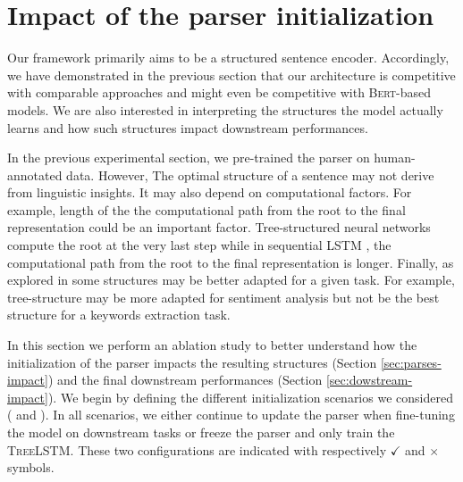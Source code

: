 


\section{Impact of the parser initialization}

Our framework primarily aims to be a structured sentence encoder. Accordingly, we have demonstrated in the previous section that our architecture is competitive with comparable approaches and might even be competitive with \textsc{Bert}-based models. We are also interested in interpreting the structures the model actually learns and how such structures impact downstream performances.

In the previous experimental section, we pre-trained the parser on human-annotated data. %
However, The optimal structure of a sentence may not derive from linguistic insights. It may also depend on computational factors. For example, length of the the computational path from the root to the final representation could be an important factor. Tree-structured neural networks compute the root at the very last step while in sequential \textsc{LSTM }, the computational path from the root to the final representation is longer. Finally, as explored in  some structures may be better adapted for a given task. For example, tree-structure may be more adapted for sentiment analysis but not be the best structure for a keywords extraction task.

In this section we perform an ablation study to better understand how the initialization of the parser impacts the resulting structures (Section \ref{sec:parses-impact}) and the final downstream performances (Section \ref{sec:dowstream-impact}). We begin by defining the different initialization scenarios we considered (
and ). In all scenarios, we either continue to update the parser when fine-tuning the model on downstream tasks or freeze the parser and only train the \textsc{TreeLSTM}. These two configurations are indicated with respectively \textbf{$\checkmark$} and \textbf{$\times$} symbols.
% 

